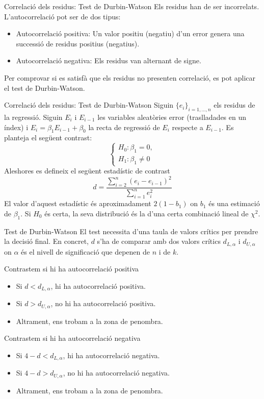 \documentclass[12pt,t]{beamer}
\renewcommand{\emph}[1]{{\color{red}#1}}
\theoremstyle{plain}
\theoremstyle{definition}
\begin{document}
\begin{frame}{Correlació dels residus: Test de Durbin-Watson}
Els residus han de ser incorrelats. L'autocorrelació pot ser de dos tipus:
\begin{itemize}
\item \emph{Autocorrelació positiva}: Un valor positiu (negatiu) d'un error genera una successió de residus positius (negatius).
\item \emph{Autocorrelació negativa}: Els residus van alternant de signe. 
\end{itemize}
Per comprovar si es satisfà que els residus no presenten correlació, es pot aplicar el test de \emph{Durbin-Watson}.

\end{frame}

\begin{frame}{Correlació dels residus: Test de Durbin-Watson}
Siguin $\{e_i\}_{i=1,\ldots,n}$ els residus de la regressió. Siguin $E_i$ i $E_{i-1}$ les variables aleatòries error (traslladades en un índex) i $E_i=\beta_1E_{i-1}+\beta_0$ la recta de regressió de $E_i$ respecte a $E_{i-1}$. Es planteja el següent contrast:
$$\left\{\begin{array}{ll} H_0: \beta_1=0,\\H_1: \beta_1\neq0\end{array}\right.$$
Aleshores es defineix el següent estadístic de contrast
$$d=\frac{\sum^n_{i=2}{(e_i-e_{i-1})^2}}{\sum_{i=1}^n{e_i^2}}$$
El valor d'aquest estadístic és aproximadament $2(1-b_1)$ on $b_1$ és una estimació de $\beta_1$. Si $H_0$ és certa, la seva distribució és la d'una certa combinació lineal de $\chi^2$. 
\end{frame}

\begin{frame}{Test de Durbin-Watson}
El test necessita d'una taula de valors crítics per prendre la decisió final. En concret, $d$ s'ha de comparar amb dos valors crítics $d_{L,\alpha}$ i $d_{U,\alpha}$ on $\alpha$ és el nivell de significació que depenen de $n$ i de $k$.

\vspace{0.25cm}
Contrastem si hi ha autocorrelació positiva
\begin{itemize}
\item Si $d<d_{L,\alpha}$, hi ha autocorrelació positiva.
\item Si $d>d_{U,\alpha}$, no hi ha autocorrelació positiva.
\item Altrament, ens trobam a la zona de penombra.
\end{itemize}

\vspace{0.25cm}
Contrastem si hi ha autocorrelació negativa
\begin{itemize}
\item Si $4-d<d_{L,\alpha}$, hi ha autocorrelació negativa.
\item Si $4-d>d_{U,\alpha}$, no hi ha autocorrelació negativa.
\item Altrament, ens trobam a la zona de penombra.
\end{itemize}

\end{frame}
\end{document}
